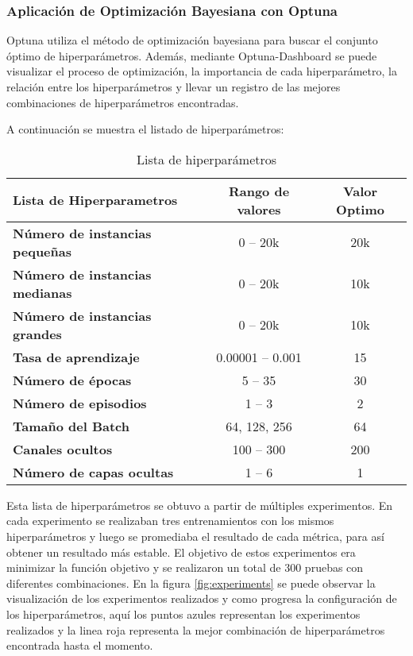 \subsubsection{Aplicación de Optimización Bayesiana con Optuna}
Optuna utiliza el método de optimización bayesiana para buscar el conjunto óptimo de
hiperparámetros. Además, mediante Optuna-Dashboard se puede visualizar el proceso de
optimización, la importancia de cada hiperparámetro, la relación entre los hiperparámetros
y llevar un registro de las mejores combinaciones de hiperparámetros encontradas.\medskip

A continuación se muestra el listado de hiperparámetros:

\begin{table}[ht]
    \centering
    \begin{tabular}[ht]{l|c|c} 
        \textbf{Lista de Hiperparametros} & \textbf{Rango de valores} & \textbf{Valor Optimo}\\
        \hline
        \textbf{Número de instancias pequeñas} & 0 -- 20k & 20k\\
        \textbf{Número de instancias medianas} & 0 -- 20k & 10k\\
        \textbf{Número de instancias grandes}  & 0 -- 20k & 10k \\
        \textbf{Tasa de aprendizaje} & 0.00001 -- 0.001 & 15 \\
        \textbf{Número de épocas} & 5 -- 35 & 30 \\ 
        \textbf{Número de episodios} & 1 -- 3 & 2 \\
        \textbf{Tamaño del Batch} & 64, 128, 256 & 64\\
        \textbf{Canales ocultos} & 100 -- 300 & 200 \\
        \textbf{Número de capas ocultas} & 1 -- 6 & 1 \\
    \end{tabular}
    \caption{Lista de hiperparámetros}
    \label{tab:hyperparams}
\end{table}

Esta lista de hiperparámetros se obtuvo a partir de múltiples experimentos. En cada 
experimento se realizaban tres entrenamientos con los mismos hiperparámetros y luego
se promediaba el resultado de cada métrica, para así obtener un resultado más estable.
El objetivo de estos experimentos era minimizar la función objetivo y se realizaron
un total de 300 pruebas con diferentes combinaciones. En la figura \ref{fig:experiments}
se puede observar la visualización de los experimentos realizados y como progresa la
configuración de los hiperparámetros, aquí los puntos azules representan los experimentos
realizados y la linea roja representa la mejor combinación de hiperparámetros encontrada
hasta el momento.

